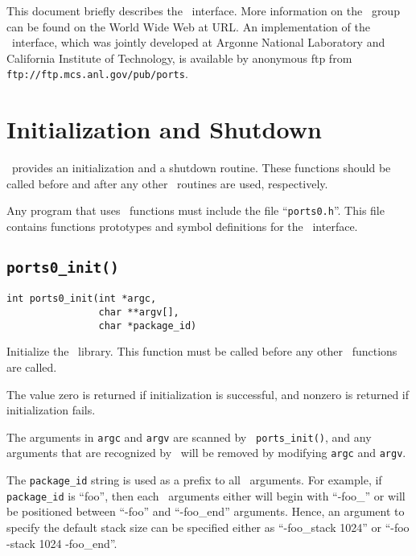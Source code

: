 This document briefly describes the \portszero\ interface.  More
information on the \ports\ group can be found on the World Wide Web at
URL.  An
implementation of the \portszero\ interface, which was jointly
developed at Argonne National Laboratory and California Institute of
Technology, is available by anonymous ftp from {\tt
ftp://ftp.mcs.anl.gov/pub/ports}.

\section{Initialization and Shutdown}

\portszero\ provides an initialization and a shutdown routine.  These
functions should be called before and after any other \portszero\
routines are used, respectively.

Any program that uses \portszero\ functions must include the file
``{\tt ports0.h}''.  This file contains functions prototypes and
symbol definitions for the
\portszero\ interface.


\subsection{\tt ports0\_init()}
\begin{verbatim}
int ports0_init(int *argc,
                char **argv[],
                char *package_id)
\end{verbatim}

Initialize the \portszero\ library.  This function must be called
before any other \portszero\ functions are called.

The value zero is returned if initialization is successful, and
nonzero is returned if initialization fails.

The arguments in {\tt argc} and {\tt argv} are scanned by {\tt
ports\_init()}, and any arguments that are recognized by \portszero\ will
be removed by modifying {\tt argc} and {\tt argv}.

The {\tt package\_id} string is used as a prefix to all \portszero\
arguments.  For example, if {\tt package\_id} is ``foo'', then each
\ports\ arguments either will begin with ``-foo\_'' or will be
positioned between ``-foo'' and ``-foo\_end'' arguments.  Hence, an
argument to specify the default stack size can be specified either as
``-foo\_stack 1024'' or ``-foo -stack 1024 -foo\_end''.

